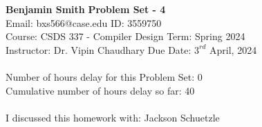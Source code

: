 \documentclass[a4paper, 11pt]{article}
\begin{document}
\noindent
\large\textbf{Benjamin Smith} \hfill \textbf{Problem Set - 4}   \\
Email: bxs566@case.edu \hfill ID: 3559750 \\
\normalsize Course: CSDS 337 - Compiler Design \hfill Term: Spring 2024\\
Instructor: Dr. Vipin Chaudhary \hfill Due Date: $3^{rd}$ April, 2024 \\ \\
Number of hours delay for this Problem Set: \hfill 0\\
Cumulative number of hours delay so far: \hfill 40 \\ \\
I discussed this homework with: \hfill Jackson Schuetzle \\ \\
\end{document}

